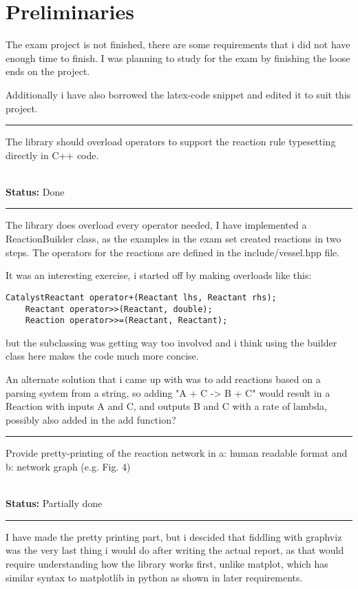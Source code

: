 \newcommand{\requirement}[2]{
    \newpage
    \hrule
    \vspace{10pt}
    {
        \large \noindent #1
    }\\
    \textbf{Status:} #2
    \vspace{10pt}
    \hrule
    \vspace{10pt}
}

\section{Preliminaries}
The exam project is not finished, there are some requirements that i did not have enough time to finish. I was planning to study for the exam by finishing the loose ends on the project.

Additionally i have also borrowed the latex-code snippet and edited it to suit this project.

\requirement{
    The library should overload operators to support the reaction rule typesetting directly in C++ code.
}{Done}
The library does overload every operator needed, I have implemented a ReactionBuilder class, as the examples in the exam set created reactions in two steps. The operators for the reactions are defined in the include/vessel.hpp file.

It was an interesting exercise, i started off by making overloads like this:

\begin{lstlisting}[style=colorC++]
    CatalystReactant operator+(Reactant lhs, Reactant rhs);
    Reactant operator>>(Reactant, double);
    Reaction operator>>=(Reactant, Reactant);
\end{lstlisting}

but the subclassing was getting way too involved and i think using the builder class here makes the code much more concise.

An alternate solution that i came up with was to add reactions based on a parsing system from a string, so adding "A + C -> B + C" would result in a Reaction with inputs A and C, and outputs B and C with a rate of lambda, possibly also added in the add function?

\requirement{
    Provide pretty-printing of the reaction network in a: human readable format and b: network graph (e.g. Fig. 4)
}{Partially done}

I have made the pretty printing part, but i descided that fiddling with graphviz was the very last thing i would do after writing the actual report, as that would require understanding how the library works first, unlike matplot, which has similar syntax to matplotlib in python as shown in later requirements.

